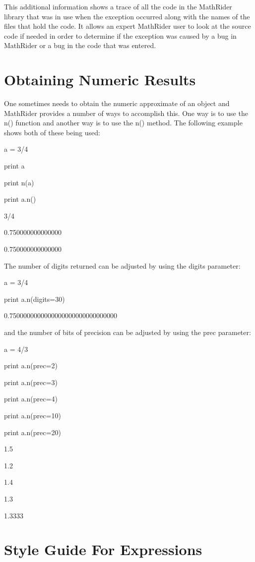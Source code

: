 \documentclass[12pt,oneside]{book}
\begin{document}
This additional information shows a trace of all the code in the MathRider library that was in use when the exception occurred along with the names of the files that hold the code. It allows an expert MathRider user to look at the source code if needed in order to determine if the exception was caused by a bug in MathRider or a bug in the code that was entered.

\section[Obtaining Numeric Results]{Obtaining Numeric Results}

One sometimes needs to obtain the numeric approximate of an object and MathRider provides a number of ways to accomplish this. One way is to use the n() function and another way is to use the n() method. The following example shows both of these being used: 

a = 3/4

print a

print n(a)

print a.n()

{\textbar}

3/4

0.750000000000000

0.750000000000000

The number of digits returned can be adjusted by using the digits parameter: 

a = 3/4

print a.n(digits=30)

{\textbar}

0.7500000000000000000000000000000


and the number of bits of precision can be adjusted by using the prec parameter:


a = 4/3

print a.n(prec=2)

print a.n(prec=3)

print a.n(prec=4)

print a.n(prec=10)

print a.n(prec=20)

{\textbar}

1.5

1.2

1.4

1.3

1.3333

\section[Style Guide For Expressions]{Style Guide For Expressions}
\end{document}
